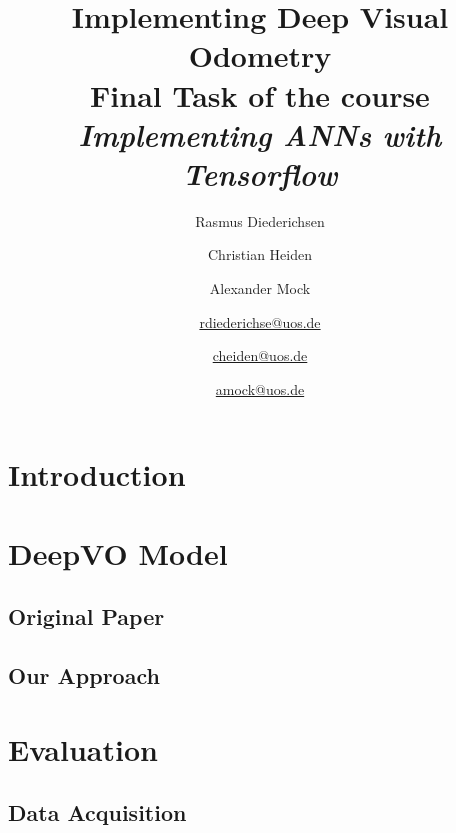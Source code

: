 \documentclass[a4paper,11pt]{article}
\title{Implementing Deep Visual Odometry\\{\large Final Task of the course \emph{Implementing ANNs with Tensorflow}}}
\author{Rasmus Diederichsen \and Christian Heiden \and Alexander Mock\\\and \href{mailto:rdiederichse@uos.de}{rdiederichse@uos.de}\and \href{mailto:cheiden@uos.de}{cheiden@uos.de} \and \href{mailto:amock@uos.de}{amock@uos.de}}
\begin{document}
\maketitle


\section{Introduction}
\label{sec:introduction}
\lipsum


\section{DeepVO Model}
\label{sec:deepvo}


\subsection{Original Paper}
\label{sec:deepvo:original}
\lipsum


\subsection{Our Approach}
\label{sec:approach}
\lipsum


\section{Evaluation}
\label{sec:evaluation}


\subsection{Data Acquisition}
\label{sec:evaluation:data}
\end{document}
